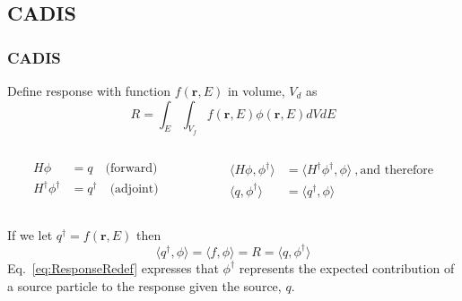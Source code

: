 \documentclass[xcolor=x11names,compress]{beamer}
\renewcommand{\(}{\begin{columns}}
\renewcommand{\)}{\end{columns}}
\newcommand{\<}[1]{\begin{column}{#1}}
\renewcommand{\>}{\end{column}}
\newcommand{\ve}[1]{\ensuremath{\mathbf{#1}}}
\begin{document}
\subsection{CADIS}
\begin{frame}[fragile]
  \frametitle{CADIS}
Define response with function $f(\ve{r}, E)$ in volume, $V_d$ as
%
\begin{equation}
 R = \int_E \int_{V_f} f(\ve{r}, E) \phi(\ve{r}, E) dV dE 
 \label{eq:Response}
\end{equation}
%
\begin{columns}
  \begin{column}{0.5\textwidth}
	\begin{align}
  	H\phi &= q \quad \text{(forward)}\nonumber \\
  	H^{\dagger} \phi^{\dagger} &= q^{\dagger} \quad 
  	\text{(adjoint)}\nonumber
  	\end{align}
  \end{column}
  \begin{column}{0.5\textwidth}
  	\begin{align}
  	\langle H\phi, \phi^{\dagger} \rangle &= \langle H^{\dagger} \phi^{\dagger}, \phi \rangle \:, \text{and therefore} \nonumber \\
  	\langle q, \phi^{\dagger} \rangle &= \langle q^{\dagger}, \phi \rangle \nonumber
  	\end{align}
  \end{column}
\end{columns}
\vspace*{1 em}
If we let $q^{\dagger} = f(\ve{r}, E)$ then
%
\begin{equation}
 \langle q^{\dagger}, \phi \rangle = \langle f, \phi \rangle = R = \langle q, \phi^{\dagger} \rangle
 \label{eq:ResponseRedef}
\end{equation}
%
Eq.\ \eqref{eq:ResponseRedef} expresses that $\phi^{\dagger}$ represents the expected contribution of a source particle to the response given the source, $q$.

\end{frame}
\end{document}
